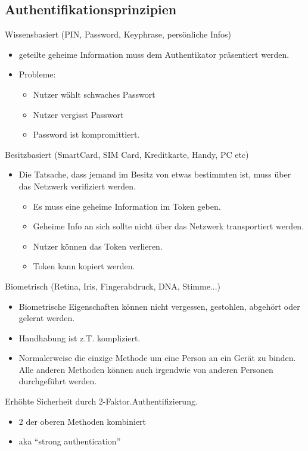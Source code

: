 \documentclass{article} %
\begin{document}
\subsection{Authentifikationsprinzipien}
Wissensbasiert (PIN, Password, Keyphrase, persönliche Infos)
\begin{itemize}
	\item geteilte geheime Information muss dem Authentikator präsentiert werden.
    \item Probleme:
    
    \begin{itemize}
        \item Nutzer wählt schwaches Passwort
        \item Nutzer vergisst Passwort
        \item Password ist kompromittiert.
    \end{itemize}
\end{itemize}
Besitzbasiert (SmartCard, SIM Card, Kreditkarte, Handy, PC etc)
\begin{itemize}
	\item Die Tatsache, dass jemand im Besitz von etwas bestimmten ist, muss über das Netzwerk verifiziert werden.
    
    \begin{itemize}
        \item Es muss eine geheime Information im Token geben.
        \item Geheime Info an sich sollte nicht über das Netzwerk transportiert werden.
        \item Nutzer können das Token verlieren.
        \item Token kann kopiert werden.
    \end{itemize}
\end{itemize}
Biometrisch (Retina, Iris, Fingerabdruck, DNA, Stimme...)
\begin{itemize}
	\item Biometrische Eigenschaften können nicht vergessen, gestohlen, abgehört oder gelernt werden.
    \item Handhabung ist z.T. kompliziert.
    \item Normalerweise die einzige Methode um eine Person an ein Gerät zu binden. Alle anderen Methoden können auch irgendwie von anderen Personen durchgeführt werden.
\end{itemize}
Erhöhte Sicherheit durch 2-Faktor.Authentifizierung.
\begin{itemize}
	\item 2 der oberen Methoden kombiniert
    \item aka "`strong authentication"'
\end{itemize}
\end{document}
